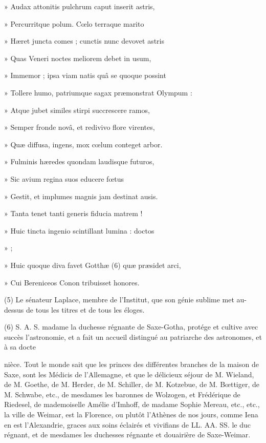 \documentclass[11pt,a4paper]{article}
\begin{document}
» Audax attonitis pulchrum caput inserit astris,

» Percurritque polum. Cœlo terraque marito

» Hæret juncta comes ; cunctis nunc devovet astris

» Quas Veneri noctes meliorem debet in usum,

» Immemor ;  ipsa viam natis quâ se quoque possint

» Tollere humo, patriumque sagax præmonstrat Olympum :

» Atque jubet similes stirpi succrescere ramos,

» Semper fronde novâ, et redivivo flore virentes,

» Quæ diffusa, ingens, mox cœlum conteget arbor.

» Fulminis hæredes quondam laudisque futuros,

» Sic avium regina suos educere fœtus

» Gestit, et implumes magnis jam destinat ausis.

» Tanta tenet tanti generis fiducia matrem !

» Huic tincta ingenio scintillant lumina : doctos

»  ;

» Huic quoque diva favet Gotthæ (6) quæ præsidet arci,

» Cui Bereniceos Conon tribuisset honores.


(5) Le sénateur Laplace, membre de l'Institut, que son génie sublime met au-dessus de tous les titres et de tous les éloges.

(6) S. A. S. madame la duchesse régnante de Saxe-Gotha, protége et cultive avec succès l'astronomie, et a fait un accueil distingué au patriarche des astronomes, et à sa docte


nièce. Tout le monde sait que les princes des différentes branches de la maison de Saxe, sont les Médicis de l'Allemagne, et que le délicieux séjour de M. Wieland, de M. Goethe, de M. Herder, de M. Schiller, de M. Kotzebue, de M. Bœttiger, de M. Schwabe, etc., de mesdames les baronnes de Wolzogen, et Frédérique de Riedesel, de mademoiselle Amélie d'Imhoff, de madame Sophie Mereau, etc., etc., la ville de Weimar, est la Florence, ou plutôt l'Athènes de nos jours, comme Iena en est l'Alexandrie, graces aux soins éclairés et vivifians de LL. AA. SS. le duc régnant, et de mesdames les duchesses régnante et douairière de Saxe-Weimar.
\end{document}

